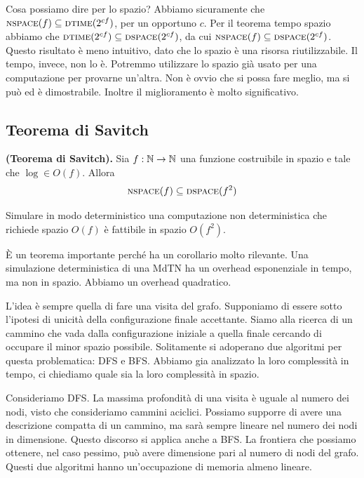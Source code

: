Cosa possiamo dire per lo spazio? Abbiamo sicuramente che $\textsc{nspace}(f) \subseteq \textsc{dtime}(2^{cf})$, per
un opportuno $c$. Per il teorema tempo spazio abbiamo che $\textsc{dtime}(2^{cf}) \subseteq
\textsc{dspace}(2^{cf})$, da cui $\textsc{nspace}(f) \subseteq \textsc{dspace}(2^{cf})$. Questo risultato è meno intuitivo,
dato che lo spazio è una risorsa riutilizzabile. Il tempo, invece, non lo è. Potremmo utilizzare lo
spazio già usato per una computazione per provarne un'altra. Non è ovvio che si possa fare meglio,
ma si può ed è dimostrabile. Inoltre il miglioramento è molto significativo.

\subsection{Teorema di Savitch}

\begin{thm}
    \textbf{(Teorema di Savitch).} Sia $f:\mathbb{N} \to \mathbb{N}$ una funzione costruibile in spazio e tale
    che $\log \in O(f)$. Allora
    \begin{equation*}
        \textsc{nspace}(f) \subseteq \textsc{dspace}(f^{2})
    \end{equation*}
\end{thm}

Simulare in modo deterministico una computazione non deterministica che richiede spazio $O(f)$ è
fattibile in spazio $O(f^{2})$.

È un teorema importante perché ha un corollario molto rilevante. Una simulazione deterministica di
una MdTN ha un overhead esponenziale in tempo, ma non in spazio. Abbiamo un overhead quadratico.

L'idea è sempre quella di fare una visita del grafo. Supponiamo di essere sotto l'ipotesi di
unicità della configurazione finale accettante. Siamo alla ricerca di un cammino che vada dalla
configurazione iniziale a quella finale cercando di occupare il minor spazio possibile. Solitamente
si adoperano due algoritmi per questa problematica: DFS e BFS. Abbiamo gia analizzato la loro
complessità in tempo, ci chiediamo quale sia la loro complessità in spazio.

Consideriamo DFS. La massima profondità di una visita è uguale al numero dei nodi, visto che
consideriamo cammini aciclici. Possiamo supporre di avere una descrizione compatta di un cammino, ma
sarà sempre lineare nel numero dei nodi in dimensione. Questo discorso si applica anche a BFS. La
frontiera che possiamo ottenere, nel caso pessimo, può avere dimensione pari al numero di nodi del
grafo. Questi due algoritmi hanno un'occupazione di memoria almeno lineare.

